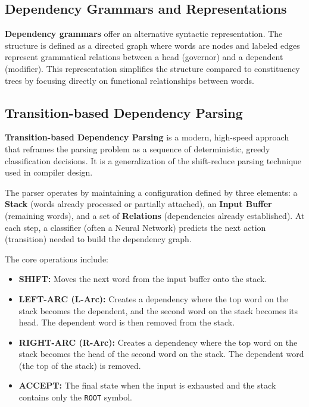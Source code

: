 \documentclass{article}
\begin{document}
\subsection{Dependency Grammars and Representations}

\textbf{Dependency grammars} offer an alternative syntactic representation. The structure is defined as a directed graph where words are nodes and labeled edges represent grammatical relations between a head (governor) and a dependent (modifier). This representation simplifies the structure compared to constituency trees by focusing directly on functional relationships between words.

\subsection{Transition-based Dependency Parsing}

\textbf{Transition-based Dependency Parsing} is a modern, high-speed approach that reframes the parsing problem as a sequence of deterministic, greedy classification decisions. It is a generalization of the shift-reduce parsing technique used in compiler design.

The parser operates by maintaining a configuration defined by three elements: a \textbf{Stack} (words already processed or partially attached), an \textbf{Input Buffer} (remaining words), and a set of \textbf{Relations} (dependencies already established). At each step, a classifier (often a Neural Network) predicts the next action (transition) needed to build the dependency graph.

The core operations include:
\begin{itemize}
    \item \textbf{SHIFT:} Moves the next word from the input buffer onto the stack.
    \item \textbf{LEFT-ARC (L-Arc):} Creates a dependency where the top word on the stack becomes the dependent, and the second word on the stack becomes its head. The dependent word is then removed from the stack.
    \item \textbf{RIGHT-ARC (R-Arc):} Creates a dependency where the top word on the stack becomes the head of the second word on the stack. The dependent word (the top of the stack) is removed.
    \item \textbf{ACCEPT:} The final state when the input is exhausted and the stack contains only the \texttt{ROOT} symbol.
\end{itemize}
\end{document}
